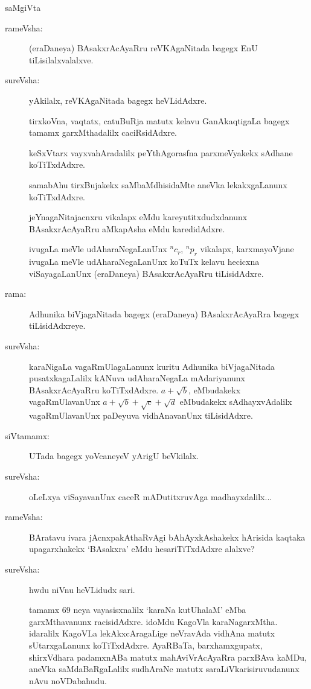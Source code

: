 \centerline{saMgiVta}
\begin{description}
\item[rameVsha:] (eraDaneya) BAsakxrAcAyaRru reVKAgaNitada bagegx EnU tiLisilalxvalalxve.

\item[sureVsha:] yAkilalx, reVKAgaNitada bagegx heVLidAdxre.

tirxkoVna, vaqtatx, catuBuRja matutx kelavu GanAkaqtigaLa bagegx tamamx garxMthadalilx caciRsidAdxre.

keSxVtarx vayxvahAradalilx peYthAgorasfna parxmeVyakekx sAdhane koTiTxdAdxre.

samabAhu tirxBujakekx saMbaMdhisidaMte aneVka lekakxgaLanunx koTiTxdAdxre.

jeYnagaNitajacnxru vikalapx eMdu kareyutitxdudxdanunx BAsakxrAcAyaRru aMkapAsha eMdu karedidAdxre.

ivugaLa meVle udAharaNegaLanUnx ${}^{n}c_{r}$, ${}^{n}p_{r}$ vikalapx, karxmayoVjane ivugaLa meVle udAharaNegaLanUnx koTuTx kelavu hecicxna viSayagaLanUnx (eraDaneya) BAsakxrAcAyaRru tiLisidAdxre.

\item[rama:] Adhunika biVjagaNitada bagegx (eraDaneya) BAsakxrAcAyaRra bagegx tiLisidAdxreye.

\item[sureVsha:] karaNigaLa vagaRmUlagaLanunx kuritu Adhunika biVjagaNitada pusatxkagaLalilx kANuva udAharaNegaLa mAdariyanunx BAsakxrAcAyaRru koTiTxdAdxre. $a+\sqrt{b}$, eMbudakekx vagaRmUlavanUnx $a+\sqrt{b}+\sqrt{c}+\sqrt{d}$ eMbudakekx sAdhayxvAdalilx vagaRmUlavanUnx paDeyuva vidhAnavanUnx tiLisidAdxre.

\item[siVtamamx:] UTada bagegx yoVcaneyeV yArigU beVkilalx.

\item[sureVsha:] oLeLxya viSayavanUnx caceR mADutitxruvAga madhayxdalilx...

\item[rameVsha:] BAratavu ivara jAcnxpakAthaRvAgi bAhAyxkAshakekx hArisida kaqtaka upagarxhakekx `BAsakxra' eMdu hesariTiTxdAdxre alalxve?

\item[sureVsha:] hwdu niVnu heVLidudx sari.

tamamx $69$ neya vayasisxnalilx `karaNa kutUhalaM' eMba garxMthavanunx racisidAdxre. idoMdu KagoVla karaNagarxMtha. idaralilx KagoVLa lekAkxcAragaLige neVravAda vidhAna matutx sUtarxgaLanunx koTiTxdAdxre. AyaRBaTa, barxhamxgupatx, shirxVdhara padamxnABa matutx mahAviVrAcAyaRra parxBAva kaMDu, aneVka saMdaBaRgaLalilx sudhAraNe matutx saraLiVkarisiruvudanunx nAvu noVDabahudu.


\end{description}
